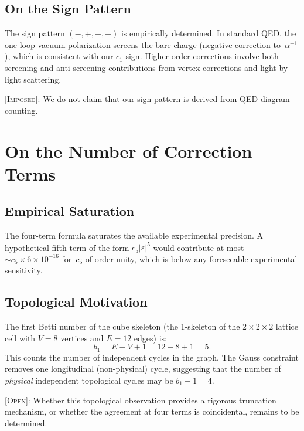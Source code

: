 \documentclass[11pt,twoside]{article}
\theoremstyle{remark}
\newcommand{\etag}[1]{\textsc{\small[#1]}}
\newcommand{\imposed}{\etag{Imposed}}
\newcommand{\openq}{\etag{Open}}
\newcommand{\eps}{\varepsilon}
\newcommand{\inv}{\alpha^{-1}}
\begin{document}
\subsection{On the Sign Pattern}
\label{sec:signs}

The sign pattern $(-, +, -, -)$ is empirically determined.
In standard QED, the one-loop vacuum polarization screens the bare charge (negative correction to~$\inv$), which is consistent with our $c_1$ sign.
Higher-order corrections involve both screening and anti-screening contributions from vertex corrections and light-by-light scattering.

\imposed: We do not claim that our sign pattern is derived from QED diagram counting.


\section{On the Number of Correction Terms}
\label{sec:truncation}

\subsection{Empirical Saturation}
\label{sec:saturation}

The four-term formula saturates the available experimental precision.
A hypothetical fifth term of the form $c_5|\eps|^5$ would contribute at most $\sim c_5 \times 6 \times 10^{-16}$ for~$c_5$ of order unity, which is below any foreseeable experimental sensitivity.

\subsection{Topological Motivation}
\label{sec:topology}

The first Betti number of the cube skeleton (the 1-skeleton of the $2 \times 2 \times 2$ lattice cell with $V=8$ vertices and $E=12$ edges) is:
\begin{equation}
\label{eq:betti}
    b_1 = E - V + 1 = 12 - 8 + 1 = 5.
\end{equation}
This counts the number of independent cycles in the graph.
The Gauss constraint removes one longitudinal (non-physical) cycle, suggesting that the number of \emph{physical} independent topological cycles may be $b_1 - 1 = 4$.

\openq: Whether this topological observation provides a rigorous truncation mechanism, or whether the agreement at four terms is coincidental, remains to be determined.
\end{document}
